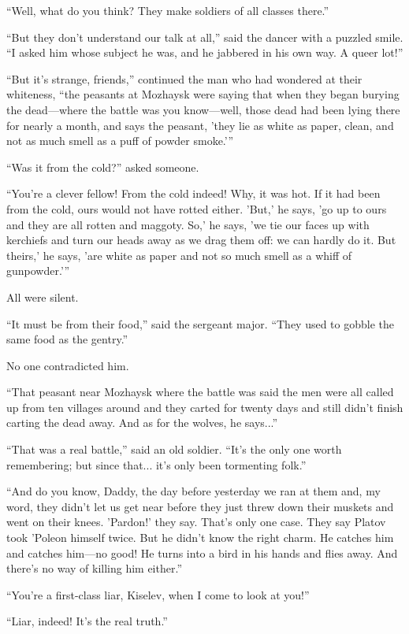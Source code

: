 ``Well, what do you think? They make soldiers of all classes
there.''

``But they don't understand our talk at all,'' said the dancer
with a puzzled smile. ``I asked him whose subject he was, and he
jabbered in his own way. A queer lot!''

``But it's strange, friends,'' continued the man who had wondered
at their whiteness, ``the peasants at Mozhaysk were saying that
when they began burying the dead---where the battle was you
know---well, those dead had been lying there for nearly a month,
and says the peasant, 'they lie as white as paper, clean, and not
as much smell as a puff of powder smoke.'{}''

``Was it from the cold?'' asked someone.

``You're a clever fellow! From the cold indeed! Why, it was
hot. If it had been from the cold, ours would not have rotted
either. 'But,' he says, 'go up to ours and they are all rotten
and maggoty. So,' he says, 'we tie our faces up with kerchiefs
and turn our heads away as we drag them off: we can hardly do
it. But theirs,' he says, 'are white as paper and not so much
smell as a whiff of gunpowder.'{}''

All were silent.

``It must be from their food,'' said the sergeant major. ``They
used to gobble the same food as the gentry.''

No one contradicted him.

``That peasant near Mozhaysk where the battle was said the men
were all called up from ten villages around and they carted for
twenty days and still didn't finish carting the dead away. And as
for the wolves, he says...''

``That was a real battle,'' said an old soldier. ``It's the only
one worth remembering; but since that... it's only been
tormenting folk.''

``And do you know, Daddy, the day before yesterday we ran at them
and, my word, they didn't let us get near before they just threw
down their muskets and went on their knees. 'Pardon!' they
say. That's only one case. They say Platov took 'Poleon himself
twice. But he didn't know the right charm. He catches him and
catches him---no good! He turns into a bird in his hands and
flies away. And there's no way of killing him either.''

``You're a first-class liar, Kiselev, when I come to look at
you!''

``Liar, indeed! It's the real truth.''

